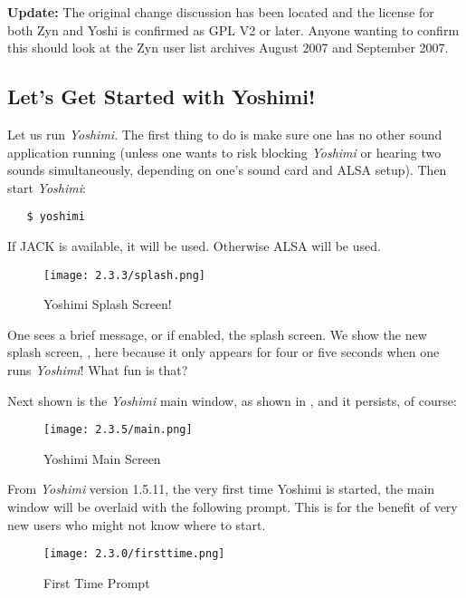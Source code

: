 \documentclass[
 11pt,
 twoside,
 a4paper,
 final                                 %
]{article}
\begin{document}
      \textbf{Update:} The original change discussion has been located and the
      license for both Zyn and Yoshi is confirmed as GPL V2 or later. Anyone
      wanting to confirm this should look at the Zyn user list archives
      August 2007 and September 2007.


\subsection{Let's Get Started with Yoshimi!}
\label{subsec:introduction_lets_get_started}

   Let us run \textsl{Yoshimi}.
   The first
   thing to do is make sure one has no other sound application running
   (unless one wants to risk blocking \textsl{Yoshimi} or hearing two sounds
   simultaneously, depending on one's sound card and ALSA setup).
   Then start \textsl{Yoshimi}:

\begin{verbatim}
   $ yoshimi
\end{verbatim}

   If JACK is available, it will be used.  Otherwise ALSA will be used.

\begin{figure}[H]
   \centering
   \texttt{[image: 2.3.3/splash.png]}
   \caption{Yoshimi Splash Screen!}
   \label{fig:yoshimi_splash_screen}
\end{figure}

   One sees a brief message, or if enabled, the splash screen.
   We show the new splash screen, ,
   here because it only appears for four or five seconds when one runs
   \textsl{Yoshimi}! What fun is that?

   Next shown is the \textsl{Yoshimi} main window,
   as shown in ,
   and it persists, of course:

\begin{figure}[H]
   \centering
   \texttt{[image: 2.3.5/main.png]}
   \caption{Yoshimi Main Screen}
   \label{fig:yoshimi_main_screen}
\end{figure}

    From \textsl{Yoshimi} version 1.5.11, the very first time Yoshimi is
    started, the main window will be overlaid with the following prompt. This
    is for the benefit of very new users who might not know where to start.

\begin{figure}[H]
   \centering
   \texttt{[image: 2.3.0/firsttime.png]}
   \caption{First Time Prompt}
   \label{fig:first_time_info}
\end{figure}
\end{document}
